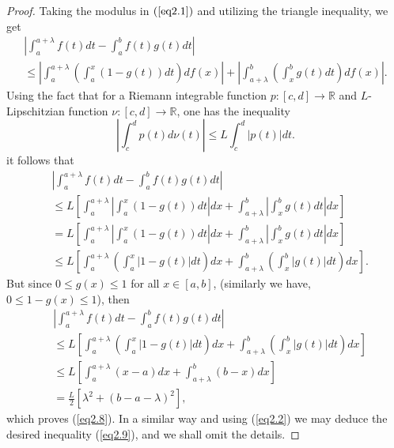 \documentclass{amsart}
\theoremstyle{plain}
\numberwithin{equation}{section}
\begin{document}
\begin{proof}
Taking the modulus in $(\ref{eq2.1})$ and utilizing the triangle
inequality, we get
\begin{multline*}
\left| {\int_a^{a + \lambda } {f\left( t \right)dt}  - \int_a^b
{f\left( t \right)g\left( t \right)dt} } \right|
\\
\le \left| {\int_a^{a + \lambda } {\left( {\int_a^x {\left( {1 -
g\left( t \right)} \right)dt} } \right)df\left( x \right)} }
\right| + \left| {\int_{a + \lambda }^b {\left( {\int_x^b {g\left(
t \right)dt} } \right)df\left( x \right)} } \right| .
\end{multline*}
Using the fact that for a Riemann integrable function
$p:[c,d]\rightarrow \mathbb{R}$ and $L$-Lipschitzian function $\nu
:[c,d]\rightarrow \mathbb{R}$, one has the inequality
\begin{equation}
\left\vert {\int_{c}^{d}{p\left( t\right) d\nu \left( t\right)
}}\right\vert \leq L\int_{c}^{d}{\left\vert {p\left( t\right)
}\right\vert dt}. \label{eq2.5}
\end{equation}
it follows that
\begin{align*}
&\left| {\int_a^{a + \lambda } {f\left( t \right)dt}  - \int_a^b
{f\left( t \right)g\left( t \right)dt} } \right|
\\
&\le L \left[{\int_a^{a + \lambda } { \left| {\int_a^x {\left( {1
- g\left( t \right)} \right)dt} } \right|dx}+\int_{a + \lambda }^b
{\left| {\int_x^b {g\left( t \right)dt} } \right|dx}} \right]
\\
&= L\left[{\int_a^{a + \lambda } { \left| {\int_a^x {\left( {1 -
g\left( t \right)} \right)dt} } \right|dx}+\int_{a + \lambda }^b
{\left| {\int_x^b {g\left( t \right)dt} } \right|dx} } \right]
\\
&\le L\left[{\int_a^{a + \lambda } {\left( { \int_a^x {\left| {1 -
g\left( t \right)} \right|dt}} \right) dx}+\int_{a + \lambda }^b {
\left( {\int_x^b {\left| {g\left( t \right)} \right|dt}} \right)
dx}} \right].
\end{align*}
But since $0 \le g(x) \le 1$ for all $x\in [a,b]$, (similarly we
have, $ 0 \le 1 - g(x) \le 1$), then
\begin{align*}
&\left| {\int_a^{a + \lambda } {f\left( t \right)dt}  - \int_a^b
{f\left( t \right)g\left( t \right)dt} } \right|
\\
&\le L\left[ {\int_a^{a + \lambda } {\left( { \int_a^x {\left| {1
- g\left( t \right)} \right|dt}} \right) dx}+\int_{a + \lambda }^b
{ \left( {\int_x^b {\left| {g\left( t \right)} \right|dt}} \right)
dx} } \right]
\\
&\le L\left[ {\int_a^{a + \lambda } {\left( { x-a} \right)
dx}+\int_{a + \lambda }^b { \left( {b-x} \right) dx} } \right]
\\
&= \frac{L}{2}\left[ {\lambda ^2 +\left( {b - a - \lambda }
\right)^2} \right],
\end{align*}
which proves (\ref{eq2.8}). In a similar way and using
(\ref{eq2.2}) we may deduce the desired inequality (\ref{eq2.9}),
and we shall omit the details.
\end{proof}
\end{document}
